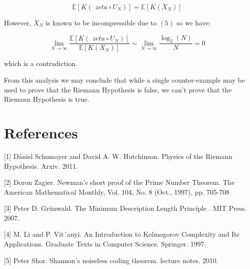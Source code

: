 \documentclass{article}
\begin{document}
\begin{equation}
\mathbb{E}[K(\textit{ zeta} \circ U_N)] = \mathbb{E}[K(X_N)]
\end{equation}

However, $X_N$ is known to be incompressible due to $(5)$ so we have: 

\begin{equation}
\lim_{N \to \infty} \frac{\mathbb{E}[K(\textit{ zeta} \circ U_N)]}{\mathbb{E}[K(X_N)]} \sim \lim_{N \to \infty} \frac{\log_2(N)}{N} = 0
\end{equation} 

which is a contradiction. 

From this analysis we may conclude that while a single counter-example may be used to prove that the Riemann Hypothesis is false, we can't prove that the Riemann Hypothesis is true. 

\section*{References}

\small

[1] Dániel Schumayer and David A. W. Hutchinson. Physics of the Riemann Hypothesis. Arxiv. 2011.

[2] Doron Zagier. Newman's short proof of the Prime Number Theorem. The American Mathematical Monthly, Vol. 104, No. 8 (Oct., 1997), pp. 705-708

[3] Peter D. Grünwald. The Minimum Description Length Principle
. MIT Press. 2007.

[4] M. Li and P. Vit´anyi. An Introduction to Kolmogorov Complexity and Its Applications. Graduate Texts in Computer Science. Springer. 1997.

[5] Peter Shor. Shannon’s noiseless coding theorem. lecture notes. 2010.
\end{document}
